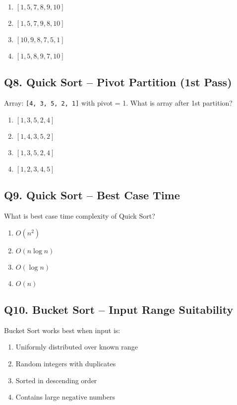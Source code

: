 \begin{enumerate}[label=(\alph*)]
    \item $[1, 5, 7, 8, 9, 10]$ 
    \item $[1, 5, 7, 9, 8, 10]$
    \item $[10, 9, 8, 7, 5, 1]$ 
    \item $[1, 5, 8, 9, 7, 10]$
\end{enumerate}


\subsection*{Q8. Quick Sort – Pivot Partition (1st Pass)}
Array: \texttt{[4, 3, 5, 2, 1]} with pivot = 1. What is array after 1st partition?

\begin{enumerate}[label=(\alph*)]
    \item $[1, 3, 5, 2, 4]$ 
    \item $[1, 4, 3, 5, 2]$ 
    \item $[1, 3, 5, 2, 4]$ 
    \item $[1, 2, 3, 4, 5]$
\end{enumerate}


\subsection*{Q9. Quick Sort – Best Case Time}
What is best case time complexity of Quick Sort?

\begin{enumerate}[label=(\alph*)]
    \item \(O(n^2)\) \quad
    \item \(O(n \log n)\) \quad
    \item \(O(\log n)\) \quad
    \item \(O(n)\)
\end{enumerate}


\subsection*{Q10. Bucket Sort – Input Range Suitability}
Bucket Sort works best when input is:

\begin{enumerate}[label=(\alph*)]
    \item Uniformly distributed over known range
    \item Random integers with duplicates
    \item Sorted in descending order
    \item Contains large negative numbers
\end{enumerate}


